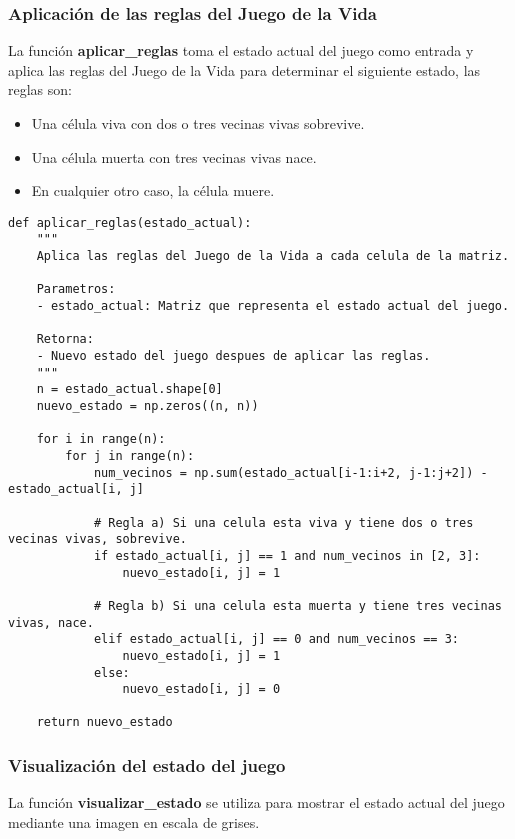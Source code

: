 \subsubsection*{Aplicación de las reglas del Juego de la Vida}

La función \textbf{aplicar\_reglas} toma el estado actual del juego como entrada y aplica las 
reglas del Juego de la Vida para determinar el siguiente estado, las reglas son:

\begin{itemize}
    \item Una célula viva con dos o tres vecinas vivas sobrevive.
    \item Una célula muerta con tres vecinas vivas nace.
    \item En cualquier otro caso, la célula muere.
\end{itemize}

\begin{lstlisting}
def aplicar_reglas(estado_actual):
    """
    Aplica las reglas del Juego de la Vida a cada celula de la matriz.
    
    Parametros:
    - estado_actual: Matriz que representa el estado actual del juego.
    
    Retorna:
    - Nuevo estado del juego despues de aplicar las reglas.
    """
    n = estado_actual.shape[0]
    nuevo_estado = np.zeros((n, n))
    
    for i in range(n):
        for j in range(n):
            num_vecinos = np.sum(estado_actual[i-1:i+2, j-1:j+2]) - estado_actual[i, j]
            
            # Regla a) Si una celula esta viva y tiene dos o tres vecinas vivas, sobrevive.
            if estado_actual[i, j] == 1 and num_vecinos in [2, 3]:
                nuevo_estado[i, j] = 1
                        
            # Regla b) Si una celula esta muerta y tiene tres vecinas vivas, nace.
            elif estado_actual[i, j] == 0 and num_vecinos == 3:
                nuevo_estado[i, j] = 1
            else:
                nuevo_estado[i, j] = 0
    
    return nuevo_estado
\end{lstlisting}

\subsubsection*{Visualización del estado del juego}

La función \textbf{visualizar\_estado} se utiliza para mostrar el estado actual del 
juego mediante una imagen en escala de grises.

